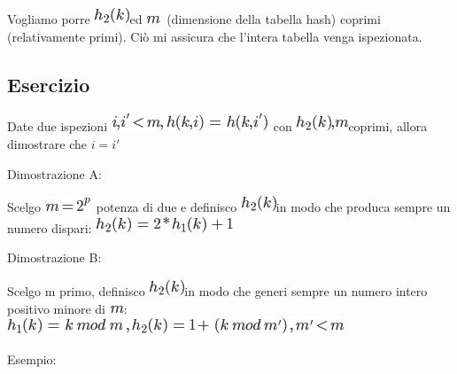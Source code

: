 \documentclass{article}
\begin{document}
{{Vogliamo porre }\includegraphics{images/image299.png}{ed
}\includegraphics{images/image235.png}{~(dimensione della tabella hash) coprimi (relativamente primi). Ciò mi assicura che l'intera tabella venga ispezionata.}

{}

\subsection{Esercizio}

{Date due ispezioni }\includegraphics{images/image300.png}{~con
}\includegraphics{images/image301.png}{coprimi, allora dimostrare che $i=i'$}

{Dimostrazione A}{:}

{Scelgo }\includegraphics{images/image303.png}{~potenza di due e definisco }\includegraphics{images/image299.png}{in modo che produca sempre un numero dispari: }\includegraphics{images/image304.png}

{Dimostrazione B}{:}

{Scelgo m primo, definisco }\includegraphics{images/image299.png}{in modo che generi sempre un numero intero positivo minore di }\includegraphics{images/image235.png}{: }\includegraphics{images/image305.png}

{Esempio:}

}
\end{document}
